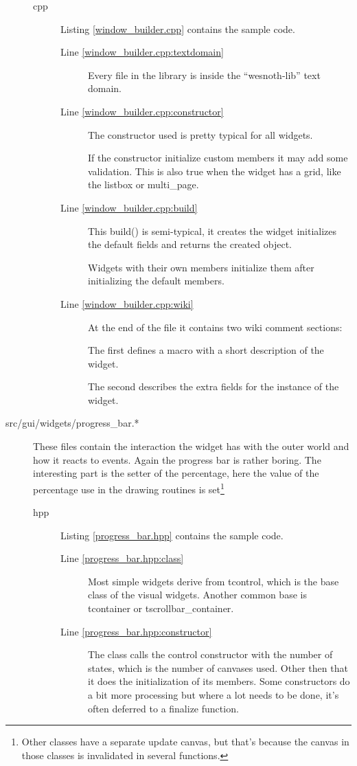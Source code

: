 \begin{description}
\begin{description}
\item[cpp] Listing \ref{window_builder.cpp} contains the sample code. 
	\begin{description}
	\item[Line \ref{window_builder.cpp:textdomain}] Every file in the library
		is inside the ``wesnoth-lib'' text domain.
	\item[Line \ref{window_builder.cpp:constructor}] The constructor used is
		pretty typical for all widgets.

		If the constructor initialize custom members it may add some validation.
		This is also true when the widget has a grid, like the listbox or
		multi\_page.
	\item[Line \ref{window_builder.cpp:build}]
		This build() is semi-typical, it creates the widget initializes the
		default fields and returns the created object.

		Widgets with their own members initialize them after initializing the
		default members.
	\item[Line \ref{window_builder.cpp:wiki}]
		At the end of the file it contains two wiki comment sections:

		The first defines a macro with a short description of the widget.

		The second describes the extra fields for the instance of the widget.
	\end{description}
\end{description}

\item[src/gui/widgets/progress\_bar.*]
	These files contain the interaction the widget has with the outer world and
	how it reacts to events. Again the progress bar is rather boring. The
	interesting part is the setter of the percentage, here the value of the
	percentage use in the drawing routines is set\footnote{Other classes have a
	separate update canvas, but that's because the canvas in those classes is
	invalidated in several functions.}

\begin{description}
\item[hpp] Listing \ref{progress_bar.hpp} contains the sample code. 
	\begin{description}
	\item[Line \ref{progress_bar.hpp:class}]
		Most simple widgets derive from tcontrol, which is the base class of the
		visual widgets. Another common base is tcontainer or
		tscrollbar\_container.

	\item[Line \ref{progress_bar.hpp:constructor}]
		The class calls the control constructor with the number of states, which
		is the number of canvases used. Other then that it does the
		initialization of its members. Some constructors do a bit more
		processing but where a lot needs to be done, it's often deferred to a
		finalize function.	


\end{description}
\end{description}
\end{description}
